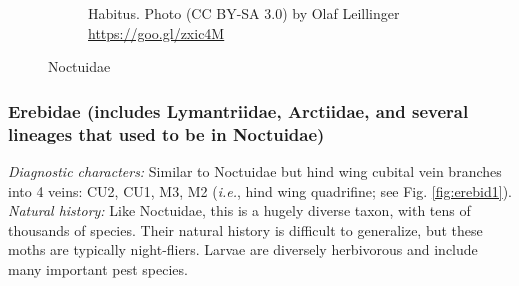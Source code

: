 \documentclass[letterpaper, 11pt]{article}
\begin{document}
\begin{figure}[ht!]
\begin{subfigure}[ht!]{0.37\textwidth}
        \caption{Habitus. Photo (CC BY-SA 3.0) by Olaf Leillinger \url{https://goo.gl/zxic4M}}
        \label{fig:noctuid2}
    \end{subfigure}
    \caption{Noctuidae}\label{fig:noctuids}
\end{figure}

\subsubsection{Erebidae (includes Lymantriidae, Arctiidae, and several lineages that used to be in Noctuidae)}
\noindent{}\textit{Diagnostic characters:} Similar to Noctuidae but hind wing cubital vein branches into 4 veins: CU2, CU1, M3, M2 (\textit{i.e.}, hind wing quadrifine; see Fig. \ref{fig:erebid1}).\\

\noindent{}\textit{Natural history:} Like Noctuidae, this is a hugely diverse taxon, with tens of thousands of species. Their natural history is difficult to generalize, but these moths are typically night-fliers. Larvae are diversely herbivorous and include many important pest species.\\
\end{document}
